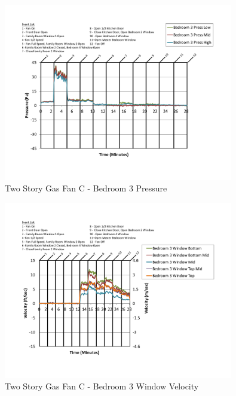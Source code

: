 \documentclass{article}
\begin{document}
\begin{appendices}
	\begin{figure}[H]
		\centering
		\includegraphics[height=3.05in,trim=0.67in 1.1in 0.67in 0.8in,clip=true]{0_Images/Results_Charts/ColdFlow/Two_Story/Gas/C/Bedroom_3_Pressure.pdf}
		\caption{Two Story Gas Fan C - Bedroom 3 Pressure}
	\end{figure}
 

	\begin{figure}[H]
		\centering
		\includegraphics[height=3.05in,trim=0.67in 1.1in 0.67in 0.8in,clip=true]{0_Images/Results_Charts/ColdFlow/Two_Story/Gas/C/Bedroom_3_Window_Velocity.pdf}
		\caption{Two Story Gas Fan C - Bedroom 3 Window Velocity}
	\end{figure}
 
	\clearpage


\end{appendices}
\end{document}
